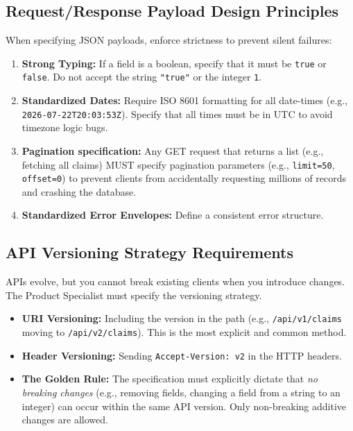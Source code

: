 \documentclass[
  11pt,
  openany,
  oneside]{book}
\providecommand{\tightlist}{%
  \setlength{\itemsep}{0pt}\setlength{\parskip}{0pt}}
\begin{document}
\subsection{Request/Response Payload Design
Principles}\label{requestresponse-payload-design-principles}

When specifying JSON payloads, enforce strictness to prevent silent
failures:

\begin{enumerate}
\def\labelenumi{\arabic{enumi}.}
\tightlist
\item
  \textbf{Strong Typing:} If a field is a boolean, specify that it must
  be \texttt{true} or \texttt{false}. Do not accept the string
  \texttt{"true"} or the integer \texttt{1}.
\item
  \textbf{Standardized Dates:} Require ISO 8601 formatting for all
  date-times (e.g., \texttt{2026-07-22T20:03:53Z}). Specify that all
  times must be in UTC to avoid timezone logic bugs.
\item
  \textbf{Pagination specification:} Any GET request that returns a list
  (e.g., fetching all claims) MUST specify pagination parameters (e.g.,
  \texttt{limit=50}, \texttt{offset=0}) to prevent clients from
  accidentally requesting millions of records and crashing the database.
\item
  \textbf{Standardized Error Envelopes:} Define a consistent error
  structure.
\end{enumerate}

\subsection{API Versioning Strategy
Requirements}\label{api-versioning-strategy-requirements}

APIs evolve, but you cannot break existing clients when you introduce
changes. The Product Specialist must specify the versioning strategy.

\begin{itemize}
\tightlist
\item
  \textbf{URI Versioning:} Including the version in the path (e.g.,
  \texttt{/api/v1/claims} moving to \texttt{/api/v2/claims}). This is
  the most explicit and common method.
\item
  \textbf{Header Versioning:} Sending \texttt{Accept-Version:\ v2} in
  the HTTP headers.
\item
  \textbf{The Golden Rule:} The specification must explicitly dictate
  that \emph{no breaking changes} (e.g., removing fields, changing a
  field from a string to an integer) can occur within the same API
  version. Only non-breaking additive changes are allowed.
\end{itemize}
\end{document}
